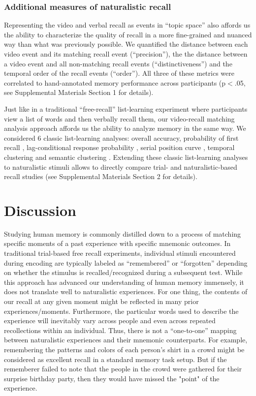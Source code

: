 \documentclass{article}
\begin{document}
{\subsubsection{Additional measures of naturalistic recall}
Representing the video and verbal recall as events in ``topic space'' also affords us the ability to characterize the quality of recall in a more fine-grained and nuanced way than what was previously possible. We quantified the distance between each video event and its matching recall event (``precision''), the the distance between a video event and all non-matching recall events (``distinctiveness'') and the temporal order of the recall events (``order''). All three of these metrics were correlated to hand-annotated memory performance across participants (p$<$.05, see Supplemental Materials Section 1 for details).

Just like in a traditional ``free-recall'' list-learning experiment where participants view a list of words and then verbally recall them, our video-recall matching analysis approach affords us the ability to analyze memory in the same way. We considered 6 classic list-learning analyses: overall accuracy, probability of first recall \citep{Hoga75, HowaKaha99, Lami99}, lag-conditional response probability \citep{Kaha96, HowaKaha99}, serial position curve \citep{Murd62a}, temporal clustering and semantic clustering \citep{HowaKaha02, PolyEtal09}. Extending these classic list-learning analyses to naturalistic stimuli allows to directly compare trial- and naturalistic-based recall studies (see Supplemental Materials Section 2 for details).

\section{Discussion}
\label{sec:discussion}
Studying human memory is commonly distilled down to a process of matching specific moments of a past experience with specific mnemonic outcomes.  In traditional trial-based free recall experiments, individual stimuli encountered during encoding are typically labeled as ``remembered'' or ``forgotten'' depending on whether the stimulus is recalled/recognized during a subsequent test. While this approach has advanced our understanding of human memory immensely, it does not translate well to naturalistic experiences. For one thing, the contents of our recall at any given moment might be reflected in many prior experiences/moments. Furthermore, the particular words used to describe the experience will inevitably vary across people and even across repeated recollections within an individual. Thus, there is not a ``one-to-one'' mapping between naturalistic experiences and their mnemonic counterparts. For example, remembering the patterns and colors of each person's shirt in a crowd might be considered as excellent recall in a standard memory task setup. But if the rememberer failed to note that the people in the crowd were gathered for their surprise birthday party, then they would have missed the "point" of the experience.

}
\end{document}
